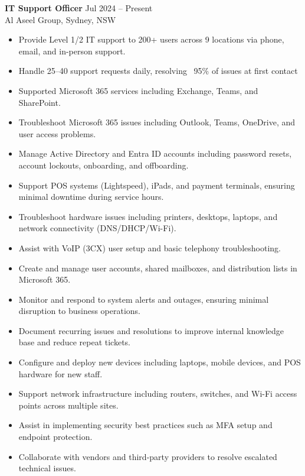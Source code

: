\documentclass[letterpaper,10pt]{article}
\begin{document}
\textbf{IT Support Officer} \hfill Jul 2024 -- Present \\
Al Aseel Group, Sydney, NSW
\begin{itemize}
  \item Provide Level 1/2 IT support to 200+ users across 9 locations via phone, email, and in-person support.
  \item Handle 25–40 support requests daily, resolving ~95\% of issues at first contact
    \item Supported Microsoft 365 services including Exchange, Teams, and SharePoint.
  \item Troubleshoot Microsoft 365 issues including Outlook, Teams, OneDrive, and user access problems.
  \item Manage Active Directory and Entra ID accounts including password resets, account lockouts, onboarding, and offboarding.
  \item Support POS systems (Lightspeed), iPads, and payment terminals, ensuring minimal downtime during service hours.
  \item Troubleshoot hardware issues including printers, desktops, laptops, and network connectivity (DNS/DHCP/Wi-Fi).
  \item Assist with VoIP (3CX) user setup and basic telephony troubleshooting.
  \item Create and manage user accounts, shared mailboxes, and distribution lists in Microsoft 365.
\item Monitor and respond to system alerts and outages, ensuring minimal disruption to business operations.
\item Document recurring issues and resolutions to improve internal knowledge base and reduce repeat tickets.
\item Configure and deploy new devices including laptops, mobile devices, and POS hardware for new staff.
\item Support network infrastructure including routers, switches, and Wi-Fi access points across multiple sites.
\item Assist in implementing security best practices such as MFA setup and endpoint protection.
\item Collaborate with vendors and third-party providers to resolve escalated technical issues.
\end{itemize}

\vspace{6pt}
\end{document}
